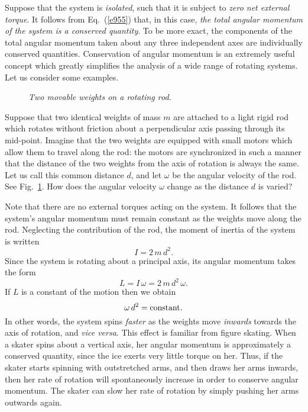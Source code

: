 Suppose that the system is {\em isolated}, such that it is subject to {\em zero net external torque}. 
It follows from Eq.~(\ref{e955}) that, in this case, {\em the total angular momentum of the
system is a conserved quantity}. To be more exact, the components of the
total angular momentum taken about any three independent axes are individually conserved quantities. 
Conservation of angular momentum  is an extremely useful concept which greatly simplifies the
analysis of  a wide range of rotating systems. Let us consider some
examples.

\begin{figure}
\epsfysize=2.5in
\centerline{}
\caption{\em Two movable weights on a rotating rod.}\label{f89}  
\end{figure}

Suppose that two identical weights of mass $m$ are attached to a light rigid rod which
rotates without friction about a perpendicular axis passing through its mid-point. Imagine that
the two weights are equipped with small motors which allow them to travel along the
rod: the motors are synchronized in such a manner  that the distance  of the two
weights from the axis of rotation is always the same. Let us call this common distance
$d$, and let $\omega$ be the angular velocity of the rod. See Fig.~\ref{f89}. How
does the angular velocity $\omega$ change as the distance $d$ is varied?

Note that there are no external torques acting on the system. It follows that the
system's angular momentum  must remain constant as the weights move along the rod. 
Neglecting the contribution of the rod, the moment of inertia of the system is
written
\begin{equation}
I = 2\,m\,d^2.
\end{equation}
Since the system is rotating about a principal axis, its angular momentum takes the form
\begin{equation}
L = I\,\omega =  2\,m\,d^2\,\omega.
\end{equation}
If $L$ is a constant of the motion then we obtain
\begin{equation}
\omega\,d^2 = {\rm constant}.
\end{equation}
In other words,  the
system spins {\em faster} as the  weights move {\em inwards}
 towards the axis of rotation, and {\em vice versa}.
This effect is familiar from figure skating. When a skater spins about a vertical axis,
her angular momentum is approximately a conserved quantity, since the ice
exerts very little torque on her. Thus, if the skater starts spinning with
outstretched arms, and then draws her arms inwards, then her rate of rotation
will spontaneously increase in order to conserve angular momentum. The skater can
slow her rate of rotation by simply pushing her arms outwards again.

